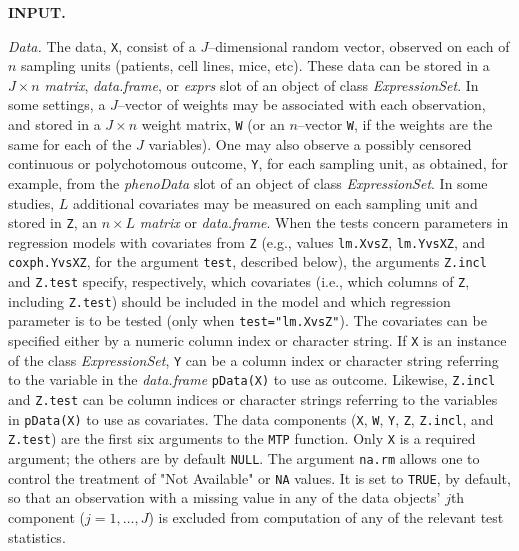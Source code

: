 \documentclass[11pt]{article}
\newcommand{\Robject}[1]{\texttt{#1}}
\newcommand{\Rclass}[1]{\textit{#1}}
\begin{document}
\noindent
{\bf  INPUT.}
\begin{description}

\item{\em Data.} 
The data, \Robject{X}, consist of a $J$--dimensional random vector, observed on each of $n$ sampling units (patients, cell lines, mice, etc). 
These data can be stored in a $J \times n$ \Rclass{matrix}, \Rclass{data.frame}, or \Rclass{exprs} slot of an object of class \Rclass{ExpressionSet}.
In some settings,  a $J$--vector of weights may be associated with each observation, and stored in a $J \times n$ weight matrix, \Robject{W} (or an $n$--vector \Robject{W}, if the weights are the same for each of the $J$ variables). 
One may also observe a possibly censored continuous or polychotomous outcome, \Robject{Y}, for each sampling unit, as obtained, for example, from the \Rclass{phenoData} slot of an object of class \Rclass{ExpressionSet}. 
In some studies, $L$ additional covariates may be measured on each sampling unit and stored in \Robject{Z}, an $n \times L$ \Rclass{matrix} or \Rclass{data.frame}. 
When the tests concern parameters in regression models with covariates from \Robject{Z} (e.g., values \Robject{lm.XvsZ}, \Robject{lm.YvsXZ}, and \Robject{coxph.YvsXZ}, for the argument \Robject{test}, described below), the arguments \Robject{Z.incl} and \Robject{Z.test} specify, respectively, which covariates (i.e., which columns of \Robject{Z}, including \Robject{Z.test}) should be included in the model and which regression parameter is to be tested (only when \texttt{test="lm.XvsZ"}). 
The covariates can be specified either by a numeric column index or character string.
If \Robject{X} is an instance of the class \Rclass{ExpressionSet}, \Robject{Y} can be a column index or character string referring to the variable in the \Rclass{data.frame} \Robject{pData(X)} to use as outcome. 
Likewise, \Robject{Z.incl} and \Robject{Z.test} can be column indices or character strings referring to the variables in \Robject{pData(X)} to use as covariates.
The data components (\Robject{X}, \Robject{W}, \Robject{Y}, \Robject{Z}, \Robject{Z.incl}, and \Robject{Z.test}) are the first six arguments to the \Robject{MTP} function. 
Only \Robject{X} is a required argument; the others are by default \Robject{NULL}.
The argument \Robject{na.rm} allows one to control the treatment of "Not Available" or \Robject{NA} values. It is set to \Robject{TRUE}, by default, so that an
observation with a missing value in any of the data objects' $j$th component ($j=1,\ldots,J$) is excluded from computation of any of the relevant test statistics.



\end{description}
\end{document}
